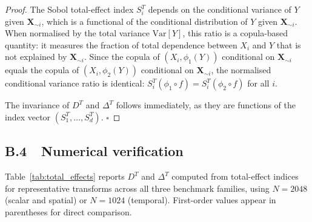 \documentclass[11pt,onecolumn]{article}
\begin{document}
\begin{proof}
The Sobol total-effect index $S_i^T$ depends on the conditional variance of
$Y$ given $\mathbf{X}_{\sim i}$, which is a functional of the conditional
distribution of $Y$ given $\mathbf{X}_{\sim i}$.  When normalised by the
total variance $\mathrm{Var}[Y]$, this ratio is a copula-based quantity:
it measures the fraction of total dependence between $X_i$ and $Y$ that
is not explained by $\mathbf{X}_{\sim i}$.  Since the copula of
$(X_i, \phi_1(Y))$ conditional on $\mathbf{X}_{\sim i}$ equals the copula
of $(X_i, \phi_2(Y))$ conditional on $\mathbf{X}_{\sim i}$, the
normalised conditional variance ratio is identical:
$S_i^T(\phi_1 \circ f) = S_i^T(\phi_2 \circ f)$ for all $i$.

The invariance of $D^T$ and $\Delta^T$ follows immediately, as they are
functions of the index vector $(S_1^T, \ldots, S_d^T)$.  $\square$
\end{proof}

\subsection*{B.4\ \ Numerical verification}

Table~\ref{tab:total_effects} reports $D^T$ and $\Delta^T$ computed from
total-effect indices for representative transforms across all three benchmark
families, using $N = 2048$ (scalar and spatial) or $N = 1024$ (temporal).
First-order values appear in parentheses for direct comparison.
\end{document}
